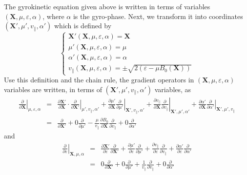 \documentclass{llncs}
\begin{document}
The gyrokinetic equation given above is written in terms of variables
$(\mathbf{X}, \mu, \varepsilon, \alpha)$, where $\alpha$ is the gyro-phase.
Next, we transform it into coordinates $(\mathbf{X}', \mu', v_{\parallel},
\alpha')$ which is defined by
\begin{equation}
  \left\{ \begin{array}{l}
    \mathbf{X}' (\mathbf{X}, \mu, \varepsilon, \alpha) =\mathbf{X}\\
    \mu' (\mathbf{X}, \mu, \varepsilon, \alpha) = \mu\\
    \alpha' (\mathbf{X}, \mu, \varepsilon, \alpha) = \alpha\\
    v_{\parallel} (\mathbf{X}, \mu, \varepsilon, \alpha) = \pm \sqrt{2
    (\varepsilon - \mu B_0 (\mathbf{X}))}
  \end{array} \right.
\end{equation}
Use this definition and the chain rule, the gradient operators in
$(\mathbf{X}, \mu, \varepsilon, \alpha)$ variables are written, in terms of
$(\mathbf{X}', \mu', v_{\parallel}, \alpha')$ variables, as
\begin{eqnarray}
  \left. \frac{\partial}{\partial \mathbf{X}} \right|_{\mu, \varepsilon,
  \alpha} & = & \frac{\partial \mathbf{X}'}{\partial \mathbf{X}} \cdot \left.
  \frac{\partial}{\partial \mathbf{X}'} \right|_{\mu', v_{\parallel}, \alpha'}
  + \frac{\partial \mu'}{\partial \mathbf{X}}  \left. \frac{\partial}{\partial
  \mu'} \right|_{\mathbf{X}', v_{\parallel}, \alpha'} + \frac{\partial
  v_{\parallel}}{\partial \mathbf{X}}  \left. \frac{\partial}{\partial
  v_{\parallel}} \right|_{\mathbf{X}', \mu', \alpha'} + \frac{\partial \alpha'
  }{\partial \mathbf{X}}  \left. \frac{\partial}{\partial \alpha'}
  \right|_{\mathbf{X}', \mu', v_{\parallel}} \nonumber\\
  & = & \frac{\partial}{\partial \mathbf{X}'} + 0 \frac{\partial}{\partial
  \mu'} - \frac{\mu}{v_{\parallel}}  \frac{\partial B_0}{\partial \mathbf{X}} 
  \frac{\partial}{\partial v_{\parallel}} + 0 \frac{\partial}{\partial
  \alpha'}  \label{19-1-2-e1}
\end{eqnarray}
and
\begin{eqnarray}
  \left. \frac{\partial}{\partial \varepsilon} \right|_{\mathbf{X}, \mu,
  \alpha} & = & \frac{\partial \mathbf{X}'}{\partial \varepsilon}
  \frac{\partial}{\partial \mathbf{X}'} + \frac{\partial \mu'}{\partial
  \varepsilon} \frac{\partial}{\partial \mu'} + \frac{\partial
  v_{\parallel}}{\partial \varepsilon} \frac{\partial}{\partial v_{\parallel}}
  + \frac{\partial \alpha'}{\partial \varepsilon} \frac{\partial}{\partial
  \alpha'} \nonumber\\
  & = & 0 \frac{\partial}{\partial \mathbf{X}'} + 0 \frac{\partial}{\partial
  \mu'} + \frac{1}{v_{\parallel}}  \frac{\partial}{\partial v_{\parallel}} + 0
  \frac{\partial}{\partial \alpha'} 
\end{eqnarray}
\end{document}
